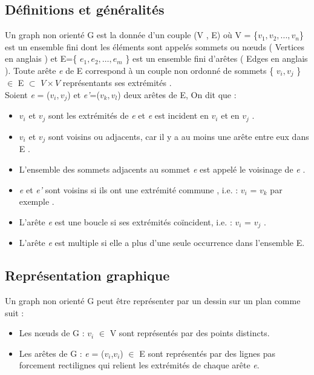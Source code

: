 	\subsection{Définitions et généralités}
		
Un graph non orienté G est la donnée d’un couple (V , E) où V = \{$ \textit{v}_{1} , \textit{v}_{2} ,..., \textit{v}_{n} $\} est un ensemble fini dont les éléments sont appelés sommets ou nœuds ( Vertices en anglais ) et E=\{ $\textit{e}_{1} ,  \textit{e}_{2} ,…, \textit{e}_{m} $  \} est un ensemble fini d'arêtes ( Edges en anglais ). Toute arête \textit{e} de E correspond à un couple non ordonné de sommets \{ $\textit{v}_{i} , \textit{v}_{j}$ \} $\in$ E $\subset$  $V \times V$ représentants ses extrémités \citep{muller} \citep{fages2014exploitation}.
\\Soient \textit{e} = ($\textit{v}_{i} , \textit{v}_{j}$) et \textit{e'}=($\textit{v}_{k} , \textit{v}_{l}$) deux arêtes de E, On dit que :
\begin{itemize}
\item $\textit{v}_{i}$ et $\textit{v}_{j}$ sont les extrémités de  \textit{e} et \textit{e} est incident en $\textit{v}_{i}$ et en  $\textit{v}_{j}$ \citep{hennecart2012elements}.
\item $\textit{v}_{i}$ et $\textit{v}_{j}$ sont voisins ou adjacents, car il y a au moins une arête entre eux dans E \citep{IUTLyonInformatique}.
\item L'ensemble des sommets adjacents au sommet \textit{e} est appelé le voisinage de \textit{e} \citep{muller}. 
\item \textit{e} et \textit{e'} sont voisins si ils ont une extrémité commune , i.e. : $\textit{v}_{i}$ = $\textit{v}_{k}$ par exemple \citep{lopez2003cours}.
\item L'arête \textit{e} est une boucle si ses extrémités coïncident, i.e. : $\textit{v}_{i}$ = $\textit{v}_{j}$ \citep{IUTLyonInformatique}. 
\item L'arête \textit{e} est multiple si elle a plus d'une seule occurrence dans l'ensemble E.
\end{itemize}	
		 
\subsection{Représentation graphique}
Un graph non orienté G peut être représenter par un dessin sur un plan comme suit \citep{muller}:

\begin{itemize}
\item Les nœuds de G : $\textit{v}_{i}$ $\in$ V sont représentés par des points distincts.
\item 	Les arêtes de G : \textit{e} = ($\textit{v}_{i}$,$\textit{v}_{i}$) $\in$ E sont représentés par des lignes pas forcement rectilignes qui relient les extrémités de chaque arête \textit{e}.
\end{itemize}

